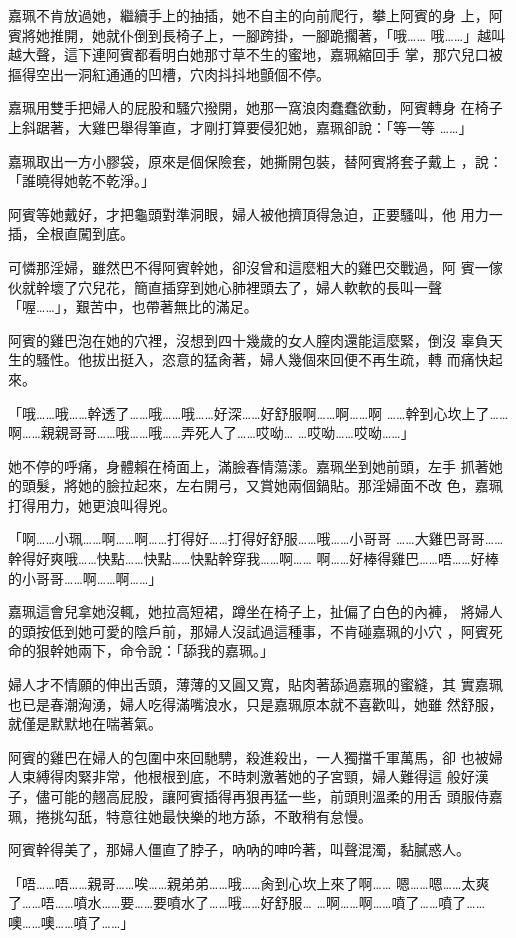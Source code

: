 嘉珮不肯放過她，繼續手上的抽插，她不自主的向前爬行，攀上阿賓的身
上，阿賓將她推開，她就仆倒到長椅子上，一腳跨掛，一腳跪擱著，「哦……
哦……」越叫越大聲，這下連阿賓都看明白她那寸草不生的蜜地，嘉珮縮回手
掌，那穴兒口被摳得空出一洞紅通通的凹槽，穴肉抖抖地顫個不停。

嘉珮用雙手把婦人的屁股和騷穴撥開，她那一窩浪肉蠢蠢欲動，阿賓轉身
在椅子上斜踞著，大雞巴舉得筆直，才剛打算要侵犯她，嘉珮卻說：「等一等
……」

嘉珮取出一方小膠袋，原來是個保險套，她撕開包裝，替阿賓將套子戴上
，說：「誰曉得她乾不乾淨。」

阿賓等她戴好，才把龜頭對準洞眼，婦人被他擠頂得急迫，正要騷叫，他
用力一插，全根直闖到底。

可憐那淫婦，雖然巴不得阿賓幹她，卻沒曾和這麼粗大的雞巴交戰過，阿
賓一傢伙就幹壞了穴兒花，簡直插穿到她心肺裡頭去了，婦人軟軟的長叫一聲
「喔……」，艱苦中，也帶著無比的滿足。

阿賓的雞巴泡在她的穴裡，沒想到四十幾歲的女人膣肉還能這麼緊，倒沒
辜負天生的騷性。他拔出挺入，恣意的猛肏著，婦人幾個來回便不再生疏，轉
而痛快起來。

「哦……哦……幹透了……哦……哦……好深……好舒服啊……啊……啊
……幹到心坎上了……啊……親親哥哥……哦……哦……弄死人了……哎呦…
…哎呦……哎呦……」

她不停的呼痛，身體賴在椅面上，滿臉春情蕩漾。嘉珮坐到她前頭，左手
抓著她的頭髮，將她的臉拉起來，左右開弓，又賞她兩個鍋貼。那淫婦面不改
色，嘉珮打得用力，她更浪叫得兇。

「啊……小珮……啊……啊……打得好……打得好舒服……哦……小哥哥
……大雞巴哥哥……幹得好爽哦……快點……快點……快點幹穿我……啊……
啊……好棒得雞巴……唔……好棒的小哥哥……啊……啊……」

嘉珮這會兒拿她沒輒，她拉高短裙，蹲坐在椅子上，扯偏了白色的內褲，
將婦人的頭按低到她可愛的陰戶前，那婦人沒試過這種事，不肯碰嘉珮的小穴
，阿賓死命的狠幹她兩下，命令說：「舔我的嘉珮。」

婦人才不情願的伸出舌頭，薄薄的又圓又寬，貼肉著舔過嘉珮的蜜縫，其
實嘉珮也已是春潮洶湧，婦人吃得滿嘴浪水，只是嘉珮原本就不喜歡叫，她雖
然舒服，就僅是默默地在喘著氣。

阿賓的雞巴在婦人的包圍中來回馳騁，殺進殺出，一人獨擋千軍萬馬，卻
也被婦人束縛得肉緊非常，他根根到底，不時刺激著她的子宮頸，婦人難得這
般好漢子，儘可能的翹高屁股，讓阿賓插得再狠再猛一些，前頭則溫柔的用舌
頭服侍嘉珮，捲挑勾舐，特意往她最快樂的地方舔，不敢稍有怠慢。

阿賓幹得美了，那婦人僵直了脖子，吶吶的呻吟著，叫聲混濁，黏膩惑人。

「唔……唔……親哥……唉……親弟弟……哦……肏到心坎上來了啊……
嗯……嗯……太爽了……唔……噴水……要……要噴水了……哦……好舒服…
…啊……啊……噴了……噴了……噢……噢……噴了……」

